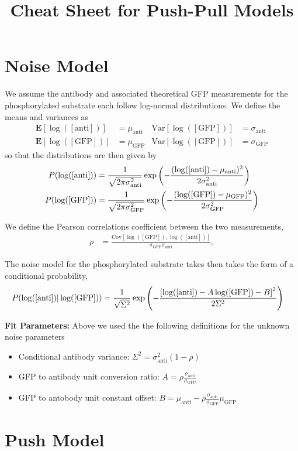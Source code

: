 \documentclass[aps,onecolumn,superscriptaddress,notitlepage]{revtex4-1}
\newcommand{\sigmaGFP}{\sigma_{\mathrm{GFP}}}
\newcommand{\sigmaanti}{\sigma_{\mathrm{anti}}}
\newcommand{\muGFP}{\mu_{\mathrm{GFP}}}
\newcommand{\muanti}{\mu_{\mathrm{anti}}}
\newcommand{\lGFP}{\log([\mathrm{GFP}])}
\newcommand{\lanti}{\log([\mathrm{anti}])}
\newcommand{\E}{\mathbf{E}}
\newcommand{\Var}{\mathrm{Var}}
\newcommand{\Cov}{\mathrm{Cov}}
\begin{document}
\title{Cheat Sheet for Push-Pull Models}
\maketitle

\section{Noise Model}

We assume the antibody and associated theoretical GFP measurements for the phosphorylated substrate each follow log-normal distributions. 
We define the means and variances as
\begin{align}
\E[\lanti] &= \muanti & \Var[\lGFP]&= \sigmaanti\\
\E[\lGFP] &= \muGFP & \Var[\lGFP] &= \sigmaGFP
\end{align}
so that the distributions are then given by
\begin{align}
P(\lanti) &= \frac{1}{\sqrt{2\pi\sigmaanti^2 }}\exp\qty(-\frac{(\lanti-\muanti)^2}{2\sigmaanti^2})\\
P(\lGFP) &= \frac{1}{\sqrt{2\pi\sigmaGFP^2 }}\exp\qty(-\frac{(\lGFP-\muGFP)^2}{2\sigmaGFP^2})
\end{align}

We define the Pearson correlations coefficient between the two measurements,
\begin{align}
\rho &= \frac{\Cov[\lGFP, \lanti]}{\sigmaGFP\sigmaanti},
\end{align}

The noise model for the phosphorylated substrate takes then takes the form of a conditional probability,
\begin{align}
P(\lanti | \lGFP) &= \frac{1}{\sqrt{\Sigma^2}}\exp\qty(-\frac{\qty[\lanti -A\lGFP - B]^2}{2 \Sigma^2})
\end{align}

\textbf{Fit Parameters:}
Above we used the the following definitions for the unknown noise parameters
\begin{itemize}
\item Conditional antibody variance:  $\Sigma^2 = \sigmaanti^2(1-\rho)$
\item GFP to antibody unit conversion ratio: $A =  \rho \frac{\sigmaanti}{\sigmaGFP}$
\item GFP to antobody unit constant offset: $B = \muanti - \rho \frac{\sigmaanti}{\sigmaGFP}\muGFP$
\end{itemize}


\section{Push Model}
\end{document}
